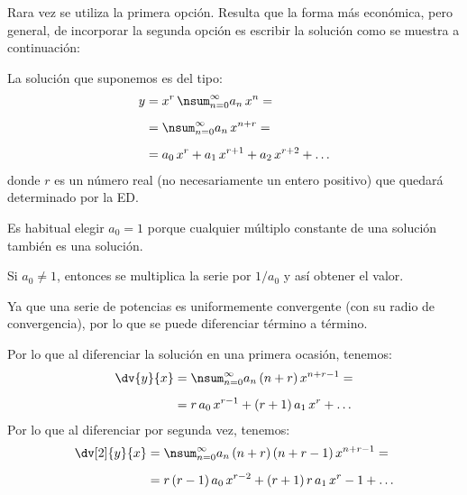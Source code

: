 Rara vez se utiliza la primera opción. Resulta que la forma más económica, pero general, de incorporar la segunda opción es escribir la solución como se muestra a continuación:
\par
La solución que suponemos es del tipo:
\begin{align}
\begin{aligned}[b]
y &= x^{r} \, \nsum_{n=0}^{\infty} a_{n} \, x^{n} = \\[0.5em]
&= \nsum_{n=0}^{\infty} a_{n} \, x^{n+r} = \\[0.5em]
&= a_{0} \, x^{r} + a_{1} \, x^{r+1} + a_{2} \, x^{r+2} + \ldots
\end{aligned}
\label{eq:ecuacion_26_08}    
\end{align}
donde $r$ es un número real (no necesariamente un entero positivo) que quedará determinado por la ED.
\par
Es habitual elegir $a_{0} = 1$ porque cualquier múltiplo constante de una solución también es una solución.
\par
Si $a_{0} \neq 1$, entonces se multiplica la serie por $1/a_{0}$ y así obtener el valor.
\par
Ya que una serie de potencias es uniformemente convergente (con su radio de convergencia), por lo que se puede diferenciar término a término.
\par
Por lo que al diferenciar la solución en una primera ocasión, tenemos:
\begin{align}
\begin{aligned}[b]
\dv{y}{x} &= \nsum_{n=0}^{\infty} a_{n} \, (n + r) \, x^{n+r-1} = \\[0.5em]
&= r \, a_{0} \, x^{r-1} + (r + 1) \, a_{1} \, x^{r} + \ldots
\end{aligned}
\label{eq:ecuacion_26_09a}
\end{align}
Por lo que al diferenciar por segunda vez, tenemos:
\begin{align}
\begin{aligned}[b]
\dv[2]{y}{x} &= \nsum_{n=0}^{\infty} a_{n} \, (n + r) \, (n + r - 1) \, x^{n+r-1} = \\[0.5em]
&= r \, (r - 1) \, a_{0} \, x^{r-2} + (r + 1) \, r \, a_{1} \, x^{r}-1 + \ldots
\end{aligned}
\label{eq:ecuacion_26_09b}
\end{align}

